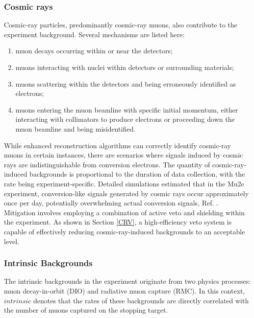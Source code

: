\subsubsection{Cosmic rays}
Cosmic-ray particles, predominantly cosmic-ray muons, also contribute to the experiment background. Several mechanisms are listed here:
\begin{enumerate}
    \item muon decays occurring within or near the detectors;
    \item muons interacting with nuclei within detectors or surrounding materials;
    \item muons scattering within the detectors and being erroneously identified as electrons;
    \item muons entering the muon beamline with specific initial momentum, either interacting with collimators to produce electrons or proceeding down the muon beamline and being misidentified.
\end{enumerate}

While enhanced reconstruction algorithms can correctly identify cosmic-ray muons in certain instances, there are scenarios where signals induced by cosmic rays are indistinguishable from conversion electrons. The quantity of cosmic-ray-induced backgrounds is proportional to the duration of data collection, with the rate being experiment-specific. Detailed simulations estimated that in the Mu2e experiment, conversion-like signals generated by cosmic rays occur approximately once per day, potentially overwhelming actual conversion signals, Ref. \cite{CRVposter}. Mitigation involves employing a combination of active veto and shielding within the experiment. As shown in Section \ref{CRV}, a high-efficiency veto system is capable of effectively reducing cosmic-ray-induced backgrounds to an acceptable level.
\subsubsection{Intrinsic Backgrounds}
The intrinsic backgrounds in the experiment originate from two physics processes: muon decay-in-orbit (DIO) and radiative muon capture (RMC). In this context, $intrinsic$ denotes that the rates of these backgrounds are directly correlated with the number of muons captured on the stopping target.
